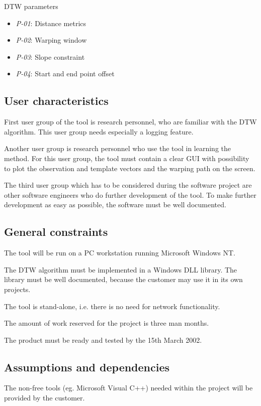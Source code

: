 \documentclass[a4paper,11pt]{article}
\begin{document}
\noindent DTW parameters
\begin{itemize}
\item \emph{P-01}: Distance metrics
\item \emph{P-02}: Warping window
\item \emph{P-03}: Slope constraint
\item \emph{P-04}: Start and end point offset
\end{itemize}


\subsection{User characteristics}
First user group of the tool is research personnel, who are familiar with the DTW algorithm. This user group needs 
especially a logging feature.

Another user group is research personnel who use the tool in learning the method. For this user group, the tool must contain 
a clear GUI with possibility to plot the observation and template vectors and the warping path on the screen.

The third user group which has to be considered during the software project are other software engineers who do further 
development of the tool. To make further development as easy as possible, the software must be well documented.

\subsection{General constraints}
The tool will be run on a PC workstation running Microsoft Windows NT.

The DTW algorithm must be implemented in a Windows DLL library. The library must be well documented, because the
customer may use it in its own projects. 

The tool is stand-alone, i.e. there is no need for network functionality.

The amount of work reserved for the project is three man months.

The product must be ready and tested by the 15th March 2002.

\subsection{Assumptions and dependencies}

The non-free tools (eg. Microsoft Visual C++) needed within the project will be provided by the customer. 
\end{document}
